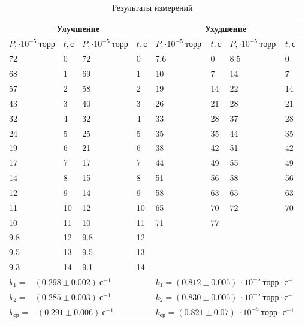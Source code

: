 \documentclass[a4paper,12pt]{article}
\begin{document}
\begin{table}[h!]
	\centering 
	\caption{Результаты измерений}
	\begin{tabular}{|l|l|l|l|l|l|l|l|} \hline 
		\multicolumn{4}{|c|}{Улучшение} & \multicolumn{4}{|c|}{Ухудшение} \\ \hline
		$P, \cdot 10^{-5}~ торр$ & $t, с$ &$P, \cdot 10^{-5}~ торр$ & $t, с$ &$P, \cdot 10^{-5}~ торр$ & $t, с$ &$P, \cdot 10^{-5}~ торр$ & $t, с$  \\ \hline
		72 & 0 & 72 & 0 & 7.6 & 0 & 8.5  & 0 \\ \hline 
		68 & 1 & 69 & 1 & 10 & 7 & 14 & 7 \\ \hline 
		57 & 2 & 58 & 2 & 19 & 14 & 22 & 14 \\ \hline 
		43 & 3 & 40 & 3 & 26 & 21 & 28 & 21 \\ \hline 
		32 & 4 & 32 & 4 & 33 & 28 & 37 & 28 \\ \hline 
		24 & 5 & 25 & 5 & 35 & 35 & 44 & 35 \\ \hline
		19 & 6 & 21 & 6 & 38 & 42 & 51 & 42 \\ \hline 
		17 & 7 & 17 & 7 & 44 & 49 & 55 & 49 \\ \hline
		14 & 8 & 15 & 8 & 51 & 56 & 58 & 56 \\ \hline 
		12 & 9 & 14 & 9 & 58 & 63 & 65 & 63 \\ \hline
		11 & 10 & 12 & 10 & 65 & 70 & 72 & 70 \\ \hline 
		10 & 11 & 10 & 11 & 71 & 77 &    &    \\ \hline
		9.8 & 12 & 9.8 & 12 &    &    &      &       \\ \hline
		9.5 & 13 & 9.5 & 13 &    &    &      &       \\ \hline 
		9.3 & 14 & 9.1 & 14 &    &    &      &       \\ \hline 
		\multicolumn{4}{|l|}{$k_1 = -(0.298 \pm 0.002) ~  с^{-1}$} & \multicolumn{4}{|l|}{$k_1 = (0.812\pm 0.005) ~ \cdot 10^{-5} ~торр \cdot с^{-1}$} \\ 
		
		\multicolumn{4}{|l|}{$k_2 = -(0.285 \pm 0.003) ~ с^{-1}$}
		&\multicolumn{4}{|l|}{$k_2 = (0.830 \pm 0.005) ~ \cdot 10^{-5} ~торр \cdot с^{-1}$} \\ 
		
		
		\multicolumn{4}{|l|}{$k_{ср} = -(0.291 \pm 0.006) ~ с^{-1}$}
		&\multicolumn{4}{|l|}{$k_{ср} = (0.821 \pm 0.07) ~ \cdot 10^{-5} ~ торр \cdot с^{-1}$} \\ 
		\hline
		
		
		
	\end{tabular}
\end{table}
\end{document}
